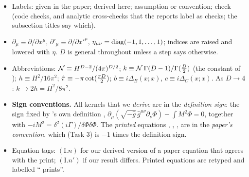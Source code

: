 \begin{notebox}
\begin{itemize}[leftmargin=1.2em,nosep]
\item Labels: \tP{} given in the paper; \tD{} derived here; \tA{} assumption or
convention; \tC{} check (code checks, and analytic cross-checks that the reports label
as checks; the subsection titles say which).
\item \(\partial_\mu\equiv\partial/\partial x^\mu\), \(\partial'_\mu\equiv\partial/\partial x'^\mu\),
\(\eta_{\mu\nu}={\rm diag}(-1,1,\ldots,1)\); indices are raised and lowered with \(\eta\).
\(D\) is general throughout unless a step says otherwise.
\item Abbreviations: \(\mathcal N\equiv H^{D-2}/(4\pi)^{D/2}\);
\(k\equiv\mathcal N\,\Gamma(D-1)/\Gamma(\tfrac D2)\) (the constant of );
\(h\equiv H^2/16\pi^2\); \(\hat\pi\equiv-\pi\cot(\tfrac{\pi D}{2})\);
\(b\equiv i\Delta_B(x;x)\), \(c\equiv i\Delta_C(x;x)\). As \(D\to4\): \(k\to2h=H^2/8\pi^2\).
\item \textbf{Sign conventions.} All kernels that we \emph{derive} are in the
\emph{definition sign}: the sign fixed by \PI's own definition ,
\(\partial_\mu(\sqrt{-\hat g}\,\hat g^{\mu\nu}\partial_\nu\Phi)-\int M^2\Phi=0\),
together with \(-iM^2=\delta^2(i\Gamma)/\delta\Phi\delta\Phi\). The \emph{printed}
equations , , ,  are in the \emph{paper's convention},
which (Task 3) is \(-1\) times the definition sign.
\item Equation tags: \((\mathrm{I}.n)\) for our derived version of a paper equation that
agrees with the print; \((\mathrm{I}.n')\) if our result differs. Printed equations are
retyped and labelled ``\PI{} prints''.
\end{itemize}
\end{notebox}

